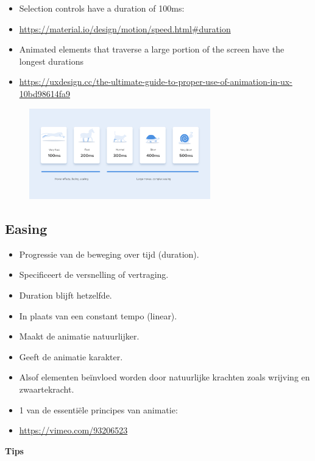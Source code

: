 \documentclass{article}
\newcommand{\bold}[1]{\textbf{#1}}
\begin{document}
\begin{itemize}
    \item Selection controls have a duration of 100ms:
    \item \url{https://material.io/design/motion/speed.html#duration}
    \item Animated elements that traverse a large portion of the screen have the longest durations
    \item \url{https://uxdesign.cc/the-ultimate-guide-to-proper-use-of-animation-in-ux-10bd98614fa9}
\end{itemize}

\begin{figure}[H]
    \centering
    \includegraphics[width=0.7\textwidth]{animation-duration.png}
    \caption{}
\end{figure}

\subsection{Easing}

\begin{itemize}
    \item Progressie van de beweging over tijd (duration).
    \item Specificeert de versnelling of vertraging.
    \item Duration blijft hetzelfde.
    \item In plaats van een constant tempo (linear).
    \item Maakt de animatie natuurlijker.
    \item Geeft de animatie karakter.
    \item Alsof elementen beïnvloed worden door natuurlijke krachten zoals wrijving en zwaartekracht.
    \item 1 van de essentiële principes van animatie:
    \item \url{https://vimeo.com/93206523}
\end{itemize}

\bold{Tips}
\end{document}
